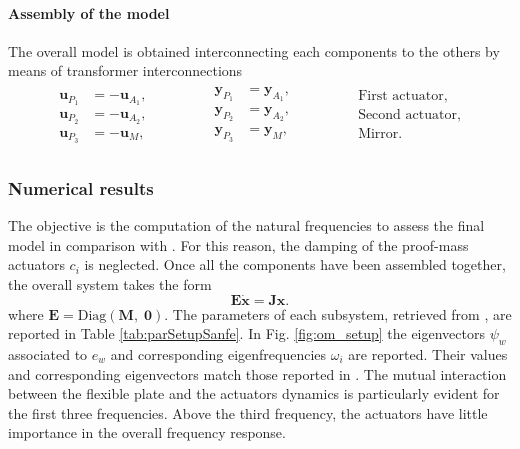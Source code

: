 \paragraph{Assembly of the model} The overall model is obtained interconnecting each components to the others by means of transformer interconnections
\begin{align*}
\begin{aligned}
\mathbf{u}_{P_1} &= - \mathbf{u}_{A_1}, \\
\mathbf{u}_{P_2} &= - \mathbf{u}_{A_2}, \\
\mathbf{u}_{P_3} &= - \mathbf{u}_{M},
\end{aligned}\qquad \qquad
\begin{aligned}
\mathbf{y}_{P_1} &= \mathbf{y}_{A_1}, \\
\mathbf{y}_{P_2} &= \mathbf{y}_{A_2}, \\
\mathbf{y}_{P_3} &= \mathbf{y}_{M}, \\
\end{aligned}\qquad \qquad
\begin{aligned}
\text{First actuator}, \\
\text{Second actuator}, \\
\text{Mirror}. \\
\end{aligned}
\end{align*}



\subsubsection{Numerical results}
The objective is the computation of the natural frequencies to assess the final model in comparison with \cite{preda2020}. For this reason, the damping of the proof-mass actuators $c_i$ is neglected. Once all the components have been assembled together, the overall system takes the form
\begin{equation*}
\mathbf{E} \dot{ \mathbf{x} } = \mathbf{J}\mathbf{x}.
\end{equation*}
where $\mathbf{E} = \mathrm{Diag}(\mathbf{M}, \; \mathbf{0})$. The parameters of each subsystem, retrieved from \cite{sanfedino2019phd}, are reported in Table \ref{tab:parSetupSanfe}. In Fig. \ref{fig:om_setup} the eigenvectors $\psi_w$ associated to $e_w$ and corresponding eigenfrequencies $\omega_i$ are reported. Their values and corresponding eigenvectors match those reported in \cite{preda2020,sanfedino2019phd}. The mutual interaction between the flexible plate and the actuators dynamics is particularly evident for the first three frequencies. Above the third frequency, the actuators have little importance in the overall frequency response.


